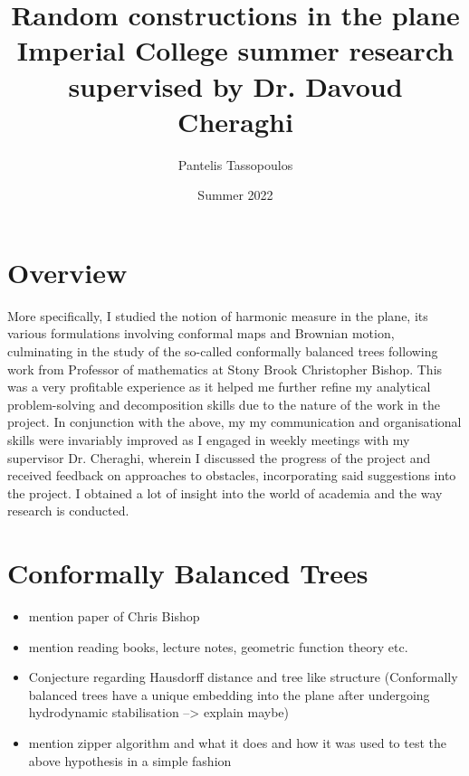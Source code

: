 \documentclass{article}
\title{\Huge Random constructions in the plane \\ 
\huge Imperial College summer research supervised by Dr. Davoud Cheraghi}
\author{\Large Pantelis Tassopoulos}
\date{\Large Summer 2022}
\begin{document}
\maketitle

\newpage 
\tableofcontents

\newpage 
\section{Overview}

More specifically, I studied the notion of harmonic measure in the plane, its various formulations involving conformal maps and Brownian motion, culminating in the study of the so-called conformally balanced trees following work from Professor of mathematics at Stony Brook Christopher Bishop. This was a very profitable experience as it helped me further refine my analytical problem-solving and decomposition skills due to the nature of the work in the project. In conjunction with the above, my my communication and organisational skills were invariably improved as I engaged in weekly meetings with my supervisor Dr. Cheraghi, wherein I discussed the progress of the project and received feedback on approaches to obstacles, incorporating said suggestions into the project. I obtained a lot of insight into the world of academia and the way research is conducted. 

\newpage
\section{Conformally Balanced Trees}
\begin{itemize}
	\item mention paper of Chris Bishop 
	\item mention reading books, lecture notes, geometric function theory etc.
	\item Conjecture regarding Hausdorff distance and tree like structure
		(Conformally balanced trees have a unique embedding into the plane after undergoing hydrodynamic stabilisation --> explain maybe)
	\item mention zipper algorithm and what it does and how it was used to test the above hypothesis in a simple fashion
	
\end{itemize}
\end{document}
